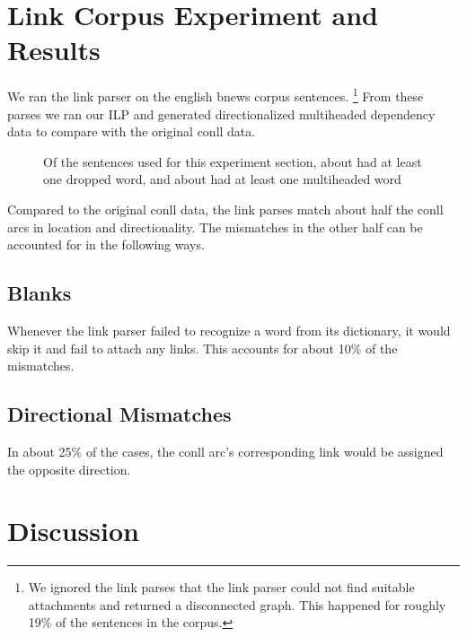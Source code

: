 \documentclass[11pt]{article}
\begin{document}




\section{Link Corpus Experiment and Results}
We ran the link parser on the english bnews corpus sentences. \footnote{We ignored the link parses that the link parser could not find suitable attachments and returned a disconnected graph. This happened for roughly 19\% of the sentences in the corpus.} 
From these parses we ran our ILP and generated directionalized multiheaded dependency data to compare with the original conll data.

\begin{figure}[ht!]
  \centering
  \small
  
  \caption{\small Of the sentences used for this experiment section, about 
    had at least one dropped word, and about 
    had at least one multiheaded word}
\end{figure}



Compared to the original conll data, the link parses match about half the conll arcs in location and directionality. The mismatches in the other half can be accounted for in the following ways.

\subsection{Blanks}
Whenever the link parser failed to recognize a word from its dictionary, it would skip it and fail to attach any links. This accounts for about 10\% of the mismatches.

\subsection{Directional Mismatches}
In about 25\% of the cases, the conll arc's corresponding link would be assigned the opposite direction.


\section{Discussion}
\end{document}

